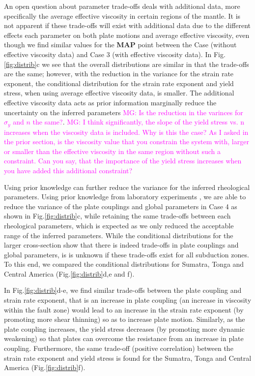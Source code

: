 \documentclass[12pt]{article}
\newcommand{\mgnote}[1]{\textcolor{magenta}{MG: #1}}
\begin{document}
{An open question about parameter trade-offs deals with additional data, more specifically the average effective viscosity in certain regions of the mantle. 
It is not apparent if these trade-offs will exist with additional data due to the different effects each parameter on both plate motions and average effective viscosity, even though we find similar values for the \textbf{MAP} point between the Case  (without effective viscosity data) and Case 3 (with effective viscosity data). In Fig.\ref{fig:distrib}c we see that the overall distributions are similar in that the trade-offs are the same; however, with the reduction in the variance for the strain rate exponent, the conditional distribution for the strain rate exponent and yield stress, when using average effective viscosity data, is smaller. The additional effective viscosity data acts as prior information marginally reduce the uncertainty on the inferred parameters \mgnote{Is the reduction in the varinces for $\sigma_y$ and $n$ the same?}. 
\mgnote{I think significantly, the slope of the yield stress vs. n increases when the viscosity data is included. Why is this the case? As I asked in the prior section, is the viscosity value that you constrain the system with, larger or smaller than the effective viscosity in the same region without such a constraint. Can you say, that the importance of the yield stress increases when you have added this additional constraint?}

Using prior knowledge can further reduce the variance for the inferred rheological parameters. Using prior knowledge from laboratory experiments \citep{korenaga2008new}, we are able to reduce the variance of the plate couplings and global parameters in Case 4 as shown in Fig.\ref{fig:distrib}c, while retaining the same trade-offs between each rheological parameters, which is expected as we only reduced the acceptable range of the inferred parameters. While the conditional distributions for the larger cross-section show that there is indeed trade-offs in plate couplings and global parameters, is is unknown if these trade-offs exist for all subduction zones. To this end, we compared the conditional distributions for Sumatra, Tonga and Central America (Fig.\ref{fig:distrib}d,e and f). 


In Fig.\ref{fig:distrib}d-e, we find similar trade-offs between the plate coupling and strain rate exponent, that is an increase in plate coupling (an increase in viscosity within the fault zone) would lead to an increase in the strain rate exponent (by promoting more shear thinning) so as to increase plate motion. Similarly, as the plate coupling increases, the yield stress decreases (by promoting more dynamic weakening) so that plates can overcome the resistance from an increase in plate coupling. Furthermore, the same trade-off (positive correlation) between the strain rate exponent and yield stress is found for the Sumatra, Tonga and Central America (Fig.\ref{fig:distrib}f). 

}
\end{document}
